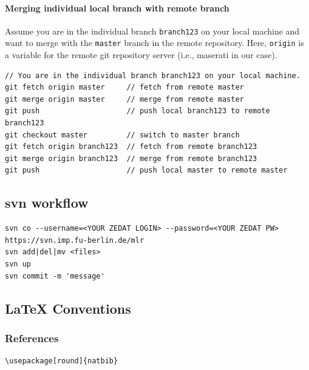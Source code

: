 \paragraph{Merging individual local branch with remote branch}

Assume you are in the individual branch \verb+branch123+ on your local machine and want to merge 
with the \verb+master+ branch in the remote repository. Here, \verb+origin+ is a variable
for the remote git repository server (i.e., maserati in our case).
\begin{verbatim}
// You are in the individual branch branch123 on your local machine.
git fetch origin master     // fetch from remote master
git merge origin master     // merge from remote master
git push                    // push local branch123 to remote branch123
git checkout master         // switch to master branch
git fetch origin branch123  // fetch from remote branch123
git merge origin branch123  // merge from remote branch123
git push                    // push local master to remote master
\end{verbatim}






\subsection{svn workflow}

\begin{code}
\begin{verbatim}
svn co --username=<YOUR ZEDAT LOGIN> --password=<YOUR ZEDAT PW> https://svn.imp.fu-berlin.de/mlr
svn add|del|mv <files>
svn up
svn commit -m 'message'
\end{verbatim}
\end{code}



\subsection{LaTeX Conventions}

\subsubsection{References}

\begin{code}
\begin{verbatim}
\usepackage[round]{natbib}

\end{verbatim}
\end{code}


